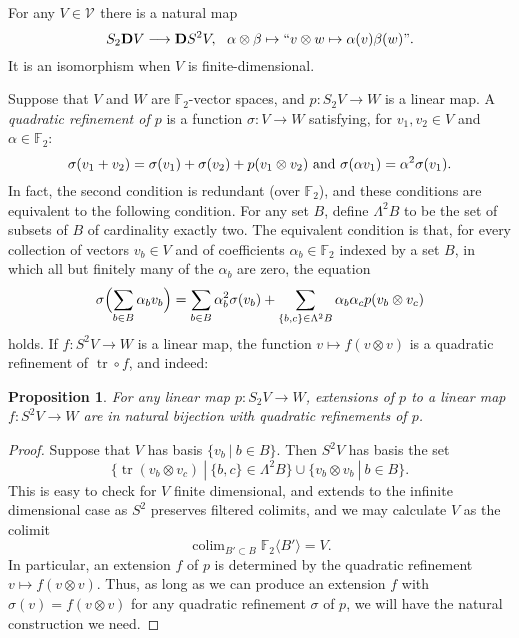 \documentclass[11pt]{amsart}
\theoremstyle{plain}
\newtheorem{prop}[thm]{Proposition}
\theoremstyle{definition}
\DeclareMathOperator{\trace}{tr}
\DeclareMathOperator*{\colim}{colim}
\renewcommand{\to}{\longrightarrow}
\newcommand{\calV}{\mathcal{V}}
\theoremstyle{plain}
\newcommand{\vect}[2]{\calV^{#1}_{#2}}
\newcommand{\F}{\mathbb{F}}
\newcommand{\Ftwo}{\F_2}
\newcommand{\dual}{\mathbf{D}}
\begin{document}
\begin{Conventions and notation}
For any $V\in \vect{}{}$ there is a natural map
\[S_2\dual V\to \dual S^2V,\ \ \alpha\otimes \beta\mapsto\textup{``$v\otimes w\mapsto \alpha(v)\beta(w)$''}.\]
It is an isomorphism when $V$ is finite-dimensional.

Suppose that $V$ and $W$ are $\Ftwo $-vector spaces, and $p:S_2V\to W$ is a linear map. A \emph{quadratic refinement of $p$} is a function $\sigma:V\to W$ satisfying, for $v_1,v_2\in V$ and $\alpha\in\Ftwo $:
\[\sigma(v_1+v_2)=\sigma(v_1)+\sigma(v_2)+p(v_1\otimes v_2)\textup{ and }\sigma(\alpha v_1)=\alpha^2\sigma(v_1).\]
In fact, the second condition is redundant (over $\Ftwo $), and these conditions are equivalent to the following condition. For any set $B$, define $\Lambda^2B$ to be the set of subsets of $B$ of cardinality exactly two. 
The equivalent condition is that, for every collection of vectors $v_b\in V$ and of coefficients $\alpha_b\in \Ftwo $ indexed by a set $B$, in which all but finitely many of the $\alpha_b$ are zero, the equation
\[\sigma\Bigl(\sum_{b\in B}\alpha_bv_b\Bigr)=\sum_{b\in B}\alpha_b^2\sigma(v_b)+\sum_{\{b,c\}\in \Lambda^2B}\alpha_b\alpha_cp(v_b\otimes v_c)\]
holds.
%
%
%
%
%
If $f:S^2V\to W$ is a linear map, the function
$v\mapsto f(v\otimes v)$
is a quadratic refinement of $\trace\circ f$, and indeed:
\begin{prop}\label{propOnExtendingToInvariants}
For any linear map $p:S_2V\to W$, extensions of $p$ to a linear map $f:S^2V\to W$ are in natural bijection  with quadratic refinements of $p$.
\end{prop}
\begin{proof}
Suppose that $V$ has basis $\{v_b\ |\ b\in B\}$. Then $S^2V$ has basis the set 
\[\{\trace(v_b\otimes v_c)\ |\ \{b,c\}\in\Lambda^2B\}\cup\{v_b\otimes v_b\ |\ b\in B\}.\]
This is easy to check for $V$ finite dimensional, and extends to the infinite dimensional case as $S^2$ preserves filtered colimits, and we may calculate $V$ as the colimit
\[\colim_{B'\subset B}\Ftwo \langle B'\rangle=V.\]
In particular, an extension $f$ of $p$ is determined by the quadratic refinement $v\mapsto f(v\otimes v)$. Thus, as long as we can produce an extension $f$ with $\sigma(v)=f(v\otimes v)$ for any quadratic refinement $\sigma$ of $p$, we will have the natural construction we need.


\end{proof}
\end{Conventions and notation}
\end{document}
